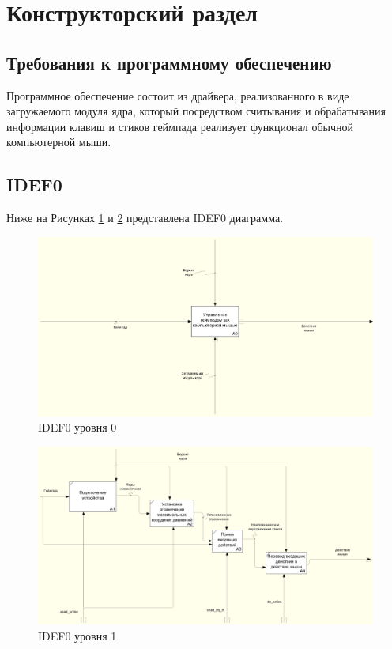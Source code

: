 \section{Конструкторский раздел}

\subsection{Требования к программному обеспечению}
Программное обеспечение состоит из драйвера, реализованного в виде
загружаемого модуля ядра, который посредством считывания и обрабатывания информации клавиш и стиков геймпада
реализует функционал обычной компьютерной мыши.

\subsection{IDEF0}
Ниже на Рисунках \ref{idef00} и \ref{idef01} представлена IDEF0 диаграмма.

\begin{figure}[h!]
	\centering
	\includegraphics[scale=0.45]{img/idef00.png}
	\caption{IDEF0 уровня 0}
	\label{idef00}
\end{figure}
\newpage
\begin{figure}[h!]
	\centering
	\includegraphics[scale=0.45]{img/idef01.png}
	\caption{IDEF0 уровня 1}
	\label{idef01}
\end{figure}\par



